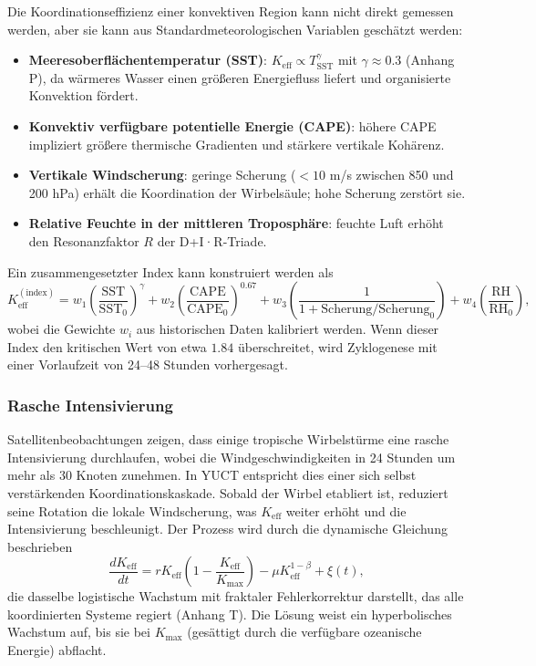\documentclass[12pt,a4paper]{article}
\newcommand{\Keff}{K_{\mathrm{eff}}}
\begin{document}
	Die Koordinationseffizienz einer konvektiven Region kann nicht direkt gemessen werden, aber sie kann aus Standardmeteorologischen Variablen geschätzt werden:
	\begin{itemize}
		\item \textbf{Meeresoberflächentemperatur (SST)}: \(K_{\mathrm{eff}} \propto T_{\mathrm{SST}}^{\gamma}\)
		mit \(\gamma \approx 0.3\) (Anhang P), da wärmeres Wasser einen größeren Energiefluss liefert und organisierte Konvektion fördert.
		\item \textbf{Konvektiv verfügbare potentielle Energie (CAPE)}: höhere CAPE impliziert größere thermische Gradienten und stärkere vertikale Kohärenz.
		\item \textbf{Vertikale Windscherung}: geringe Scherung (\(< 10\) m/s zwischen 850 und 200 hPa) erhält die Koordination der Wirbelsäule; hohe Scherung zerstört sie.
		\item \textbf{Relative Feuchte in der mittleren Troposphäre}: feuchte Luft erhöht den Resonanzfaktor \(R\) der D+I·R-Triade.
	\end{itemize}
	Ein zusammengesetzter Index kann konstruiert werden als
	\[
	\Keff^{\mathrm{(index)}} = w_1 \left( \frac{\mathrm{SST}}{\mathrm{SST}_0} \right)^{\gamma}
	+ w_2 \left( \frac{\mathrm{CAPE}}{\mathrm{CAPE}_0} \right)^{0.67}
	+ w_3 \left( \frac{1}{1 + \mathrm{Scherung}/\mathrm{Scherung}_0} \right)
	+ w_4 \left( \frac{\mathrm{RH}}{\mathrm{RH}_0} \right),
	\]
	wobei die Gewichte \(w_i\) aus historischen Daten kalibriert werden. Wenn dieser Index den kritischen Wert von etwa \(1.84\) überschreitet, wird Zyklogenese mit einer Vorlaufzeit von 24–48 Stunden vorhergesagt.
	
	\subsubsection*{Rasche Intensivierung}
	
	Satellitenbeobachtungen zeigen, dass einige tropische Wirbelstürme eine rasche Intensivierung durchlaufen, wobei die Windgeschwindigkeiten in 24 Stunden um mehr als 30 Knoten zunehmen. In YUCT entspricht dies einer sich selbst verstärkenden Koordinationskaskade. Sobald der Wirbel etabliert ist, reduziert seine Rotation die lokale Windscherung, was \(\Keff\) weiter erhöht und die Intensivierung beschleunigt. Der Prozess wird durch die dynamische Gleichung beschrieben
	\[
	\frac{d\Keff}{dt} = r \Keff \left( 1 - \frac{\Keff}{K_{\max}} \right)
	- \mu \Keff^{1-\beta} + \xi(t),
	\]
	die dasselbe logistische Wachstum mit fraktaler Fehlerkorrektur darstellt, das alle koordinierten Systeme regiert (Anhang T). Die Lösung weist ein hyperbolisches Wachstum auf, bis sie bei \(K_{\max}\) (gesättigt durch die verfügbare ozeanische Energie) abflacht.
	
\end{document}
